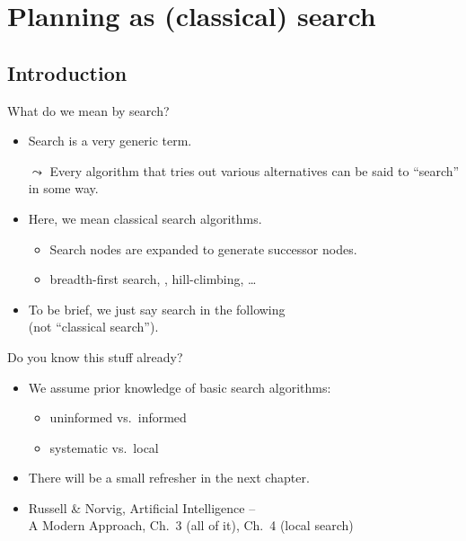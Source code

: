 \documentclass{gkibeamer}
\begin{document}
\subtitle{Planning as search: progression and regression}
\date{November 4th, 2011}
\maketitles

\section[Search]{Planning as (classical) search}
\subsection{Introduction}

\begin{frame}{What do we mean by search?}
  \begin{itemize}
  \item \alert{Search} is a very generic term.
  \item[$\leadsto$] Every algorithm that tries out various
    alternatives can be said to ``search'' in some way.
  \item Here, we mean \alert{classical search} algorithms.
    \begin{itemize}
    \item \alert{Search nodes} are \alert{expanded} to
      generate \alert{successor nodes}.
    \item {} breadth-first search, \astar,
      hill-climbing, \dots
    \end{itemize}
  \item To be brief, we just say \alert{search} in the following \\
    (not ``classical search'').
  \end{itemize}
\end{frame}

\begin{frame}{Do you know this stuff already?}
  \begin{itemize}
  \item We \alert{assume prior knowledge} of basic search algorithms:
    \begin{itemize}
    \item uninformed vs.\ informed
    \item systematic vs.\ local
    \end{itemize}
  \item There will be a small refresher in the next chapter.
  \item {} Russell \& Norvig, Artificial
    Intelligence -- \\ A Modern Approach, Ch.~3 (all of it), Ch.~4 (local
    search)
  \end{itemize}
\end{frame}
\end{document}
